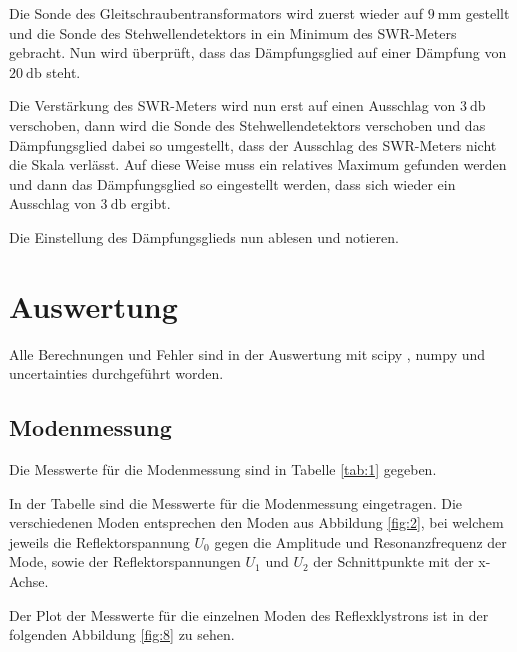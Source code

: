                 Die Sonde des Gleitschraubentransformators wird zuerst wieder auf $\SI{9}{\milli\metre}$ gestellt und die Sonde des Stehwellendetektors in ein Minimum des SWR-Meters gebracht.
                Nun wird überprüft, dass das Dämpfungsglied auf einer Dämpfung von $\SI{20}{\decibel}$ steht.

                Die Verstärkung des SWR-Meters wird nun erst auf einen Ausschlag von $\SI{3}{\decibel}$ verschoben, dann wird die Sonde des Stehwellendetektors verschoben und das Dämpfungsglied dabei so umgestellt, dass der Ausschlag des SWR-Meters nicht die Skala verlässt.
                Auf diese Weise muss ein relatives Maximum gefunden werden und dann das Dämpfungsglied so eingestellt werden, dass sich wieder ein Ausschlag von $\SI{3}{\decibel}$ ergibt.
                
                Die Einstellung des Dämpfungsglieds nun ablesen und notieren.
%
%
    \section{Auswertung}
        Alle Berechnungen und Fehler sind in der Auswertung mit scipy \cite{scipy}, numpy \cite{numpy} und
        uncertainties \cite{uncertainties} durchgeführt worden.
            \subsection{Modenmessung}
                Die Messwerte für die Modenmessung sind in Tabelle \ref{tab:1} gegeben.
                \begin{table}[H]
                    \centering
                    \caption{
                        In der Tabelle sind die Messwerte für die Modenmessung eingetragen.
                        Die verschiedenen Moden entsprechen den Moden aus Abbildung \ref{fig:2}, bei
                        welchem jeweils die Reflektorspannung $U_0$ gegen die Amplitude und Resonanzfrequenz der Mode, sowie
                        der Reflektorspannungen $U_1$ und $U_2$ der Schnittpunkte mit der x-Achse.
                    } 
                    
                    \label{tab:1} 
                \end{table}
                
                Der Plot der Messwerte für die einzelnen Moden des Reflexklystrons ist in der folgenden Abbildung \ref{fig:8}  zu sehen.

